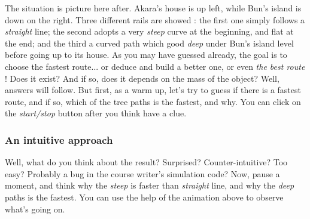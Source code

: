 \documentclass{article}
\begin{document}
The situation is picture here after. Akara's house is up left, while Bun's island is down on the right. Three different rails are showed : the first one simply follows a \textit{straight} line; the second adopts a very \textit{steep} curve at the beginning, and flat at the end; and the third a curved path which good \textit{deep} under Bun's island level before going up to its house. As you may have guessed already, the goal is to choose the fastest route... or deduce and build a better one, or even \textit{the best route} ! Does it exist? And if so, does it depends on the mass of the object? Well, answers will follow. But first, as a warm up, let's try to guess if there is a fastest route, and if so, which of the tree paths is the fastest, and why. You can click on the \textit{start/stop} button after you think have a clue.



\subsubsection*{An intuitive approach}

Well, what do you think about the result? Surprised? Counter-intuitive? Too easy? Probably a bug in the course writer's simulation code? Now, pause a moment, and think why the \textit{steep} is faster than \textit{straight} line, and why the \textit{deep} paths is the fastest. You can use the help of the animation above to observe what's going on.\\
\end{document}
